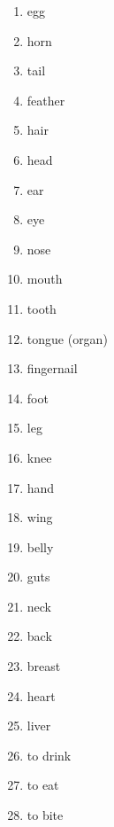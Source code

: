 \documentclass[a5,landscape]{article}
\begin{document}
{\begin{multicols}{4}
\begin{enumerate}
\item   egg 

\item   horn 

\item   tail 

\item   feather 

\item   hair 

\item   head 

\item   ear 

\item   eye 

\item   nose 

\item   mouth 

\item   tooth 

\item   tongue (organ) 

\item   fingernail 

\item   foot 

\item   leg 

\item   knee 

\item   hand 

\item   wing 

\item   belly 

\item   guts 

\item   neck 

\item   back 

\item   breast 

\item   heart 

\item   liver 

\item   to drink 

\item   to eat 

\item   to bite 


\end{enumerate}
\end{multicols}}
\end{document}
